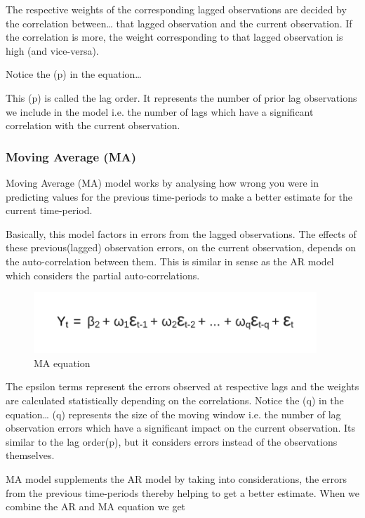 \documentclass[12pt]{report}
\begin{document}
The respective weights of the corresponding lagged observations are decided by the correlation between… that lagged observation and the current observation. If the correlation is more, the weight corresponding to that lagged observation is high (and vice-versa).

Notice the (p) in the equation…

This (p) is called the lag order. It represents the number of prior lag observations we include in the model i.e. the number of lags which have a significant correlation with the current observation.

\subsubsection{Moving Average (MA)}
Moving Average (MA) model works by analysing how wrong you were in predicting values for the previous time-periods to make a better estimate for the current time-period.

Basically, this model factors in errors from the lagged observations. The effects of these previous(lagged) observation errors, on the current observation, depends on the auto-correlation between them. This is similar in sense as the AR model which considers the partial auto-correlations.

\begin{figure}[H]%
  \begin {center}
  \includegraphics[width=0.95\textwidth]{images/MA_.png}
  \caption{MA equation}
  \label{fig:ecg}
  \end {center}
\end{figure}

The epsilon terms represent the errors observed at respective lags and the weights are calculated statistically depending on the correlations.
Notice the (q) in the equation…
(q) represents the size of the moving window i.e. the number of lag observation errors which have a significant impact on the current observation. Its similar to the lag order(p), but it considers errors instead of the observations themselves.

MA model supplements the AR model by taking into considerations, the errors from the previous time-periods thereby helping to get a better estimate.
When we combine the AR and MA equation we get
\end{document}
